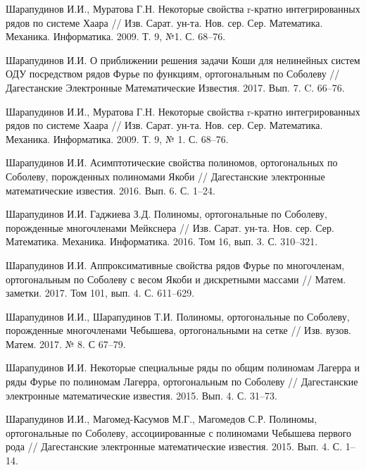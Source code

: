 \begin{thebibliography}{111}
Шарапудинов И.И., Муратова Г.Н. Некоторые свойства r-кратно интегрированных рядов по системе Хаара // Изв. Сарат. ун-та. Нов. сер. Сер. Математика. Механика. Информатика. 2009. Т. 9, №1. С. 68--76.


Шарапудинов И.И. О приближении решения задачи Коши для нелинейных систем ОДУ посредством рядов Фурье по функциям, ортогональным по Соболеву // Дагестанские Электронные Математические Известия. 2017. Вып. 7. C. 66--76.

Шарапудинов И.И., Муратова Г.Н. Некоторые свойства r-кратно интегрированных рядов по системе Хаара // Изв. Сарат. ун-та. Нов. сер. Сер. Математика. Механика. Информатика. 2009. Т. 9, № 1. С. 68--76.

Шарапудинов И.И.  Асимптотические свойства полиномов, ортогональных по Соболеву, порожденных полиномами Якоби // Дагестанские электронные математические известия. 2016. Вып. 6. С. 1--24.

Шарапудинов И.И. Гаджиева З.Д. Полиномы, ортогональные по Соболеву, порожденные многочленами Мейкснера // Изв. Сарат. ун-та. Нов. сер. Сер. Математика. Механика. Информатика. 2016. Том 16, вып. 3. С. 310--321.

Шарапудинов И.И. Аппроксимативные свойства рядов Фурье по многочленам, ортогональным по Соболеву с весом Якоби и дискретными массами // Матем. заметки. 2017. Том 101, вып. 4. С. 611--629.

Шарапудинов И.И., Шарапудинов Т.И. Полиномы, ортогональные по Соболеву, порожденные многочленами Чебышева, ортогональными на сетке // Изв. вузов. Матем. 2017. № 8. С 67--79.

Шарапудинов И.И. Некоторые специальные ряды по общим полиномам Лагерра и ряды Фурье по полиномам Лагерра, ортогональным по Соболеву // Дагестанские электронные математические известия. 2015. Вып. 4. С. 31--73.

Шарапудинов И.И., Магомед-Касумов М.Г., Магомедов С.Р. Полиномы, ортогональные по Соболеву, ассоциированные с полиномами Чебышева первого рода // Дагестанские электронные математические известия. 2015. Вып. 4. С. 1--14.


\end{thebibliography}

